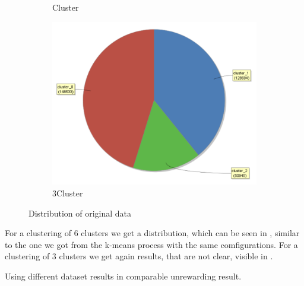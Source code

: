 \begin{figure}[H]
\begin{subfigure}{.3\textwidth}
  \caption{Cluster}
  \label{fig:PCAOrgCl}
\end{subfigure}
\begin{subfigure}{.3\textwidth}
  \centering
  \includegraphics[width=.9\linewidth]{ClusterPCAOrigRapidCluster2Cluster.PNG}
  \caption{3Cluster}
  \label{fig:PCAOrgCl3}
\end{subfigure}
\caption{Distribution of original data}
\label{fig:PCAOrgDist}
\vspace*{-2em}
\end{figure}

For a clustering of 6 clusters we get a distribution, which can be seen in , similar to the one we got from the k-means process with the same comfigurations. 
For a clustering of 3 clusters we get again results, that are not clear, visible in .


Using different dataset results in comparable unrewarding result.
\vspace*{-2em}